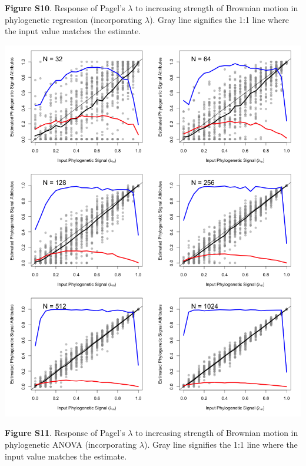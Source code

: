 \documentclass[
]{article}
\begin{document}
\textbf{Figure S10}. Response of Pagel's \(\lambda\) to increasing
strength of Brownian motion in phylogenetic regression (incorporating
\(\lambda\)). Gray line signifies the 1:1 line where the input value
matches the estimate.

\includegraphics[width=0.95\linewidth]{fig.S11}

\textbf{Figure S11}. Response of Pagel's \(\lambda\) to increasing
strength of Brownian motion in phylogenetic ANOVA (incorporating
\(\lambda\)). Gray line signifies the 1:1 line where the input value
matches the estimate.
\end{document}
